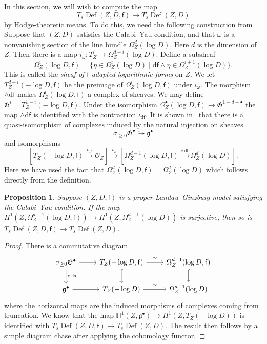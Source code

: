 \documentclass[10pt]{amsart}
\numberwithin{equation}{section}
\theoremstyle{plain}
\newtheorem{proposition}[theorem]{Proposition}
\theoremstyle{definition}
\theoremstyle{remark}
\DeclareMathOperator{\Def}{Def}
\begin{document}
In this section, we will wish to compute the map
\[
  T_s \Def(Z,D,\mathsf{f})\rightarrow T_s \Def(Z,D)
\]
by Hodge-theoretic means. To do this, we need the following construction from~\cite{katzarkov2017bogomolov}. Suppose that \((Z,D)\) satisfies the Calabi--Yau condition, and that \(\omega\) is a nonvanishing section of the line bundle \(\Omega^d_Z(\log D)\). Here \(d\) is the dimension of \(Z\). Then there is a map \(i_\omega: T^i_Z\rightarrow \Omega^{d-i}_Z(\log D)\). Define a subsheaf
\[
  \Omega_Z^i(\log D,\mathsf{f}) = \{ \eta \in \Omega_Z^i(\log D) \mid \mathrm{d}\mathsf{f} \wedge \eta \in \Omega_Z^{i+1}(\log D)\}.
\]
This is called the \emph{sheaf of \(\mathsf{f}\)-adapted logarithmic forms} on \(Z\). We let \(T^{d-i}_Z(-\log D, \mathsf{f})\) be the preimage of \(\Omega_Z^i(\log D,\mathsf{f})\) under \(i_\omega\). The morphism \(\wedge \mathrm{d}\mathsf{f}\) makes \(\Omega_{Z}^i(\log D,\mathsf{f})\) a complex of sheaves. We may define \(\mathfrak{G}^i = T^{1-i}_Z(-\log  D, \mathsf{f})\). Under the isomorphism \(\Omega_Z^\bullet(\log D, \mathsf{f})\rightarrow \mathfrak{G}^{1-d+\bullet}\) the map \(\wedge \mathrm{d}\mathsf{f}\) is identified with the contraction \(\iota_{\mathrm{d}\mathsf{f}}\). It is shown in~\cite{katzarkov2017bogomolov} that there is a quasi-isomorphism of complexes induced by the natural injection on sheaves
\[
  \sigma_{\geq 0} \mathfrak{G}^\bullet \hookrightarrow \mathfrak{g}^\bullet
\]
and isomorphisms
\[
  \left[ T_Z(-\log D, \mathsf{f} ) \xrightarrow{\iota_{\mathrm{d}\mathsf{f}}} \mathcal{O}_Z\right] \xrightarrow{ \iota_{\omega} } \left[ \Omega^{d-1}_Z(\log D,\mathsf{f}) \xrightarrow{\wedge \mathrm{d}\mathsf{f} }\Omega^d_Z(\log D)\right].
\]
Here we have used the fact that \(\Omega_Z^d(\log D,\mathsf{f}) = \Omega_Z^d(\log D)\) which follows directly from the definition.

\begin{proposition}\label{proposition:surjmap}
  Suppose \((Z,D,\mathsf{f})\) is a proper Landau--Ginzburg model satisfying the Calabi--Yau condition. If the map \(H^{1}(Z,\Omega^{d-1}_Z(\log D,\mathsf{f})) \rightarrow H^1(Z,\Omega^{d-1}_Z(\log D))\) is surjective, then so is \(T_s \Def(Z,D,\mathsf{f}) \rightarrow T_s \Def(Z,D)\).
\end{proposition}

\begin{proof}
  There is a commutative diagram
  \[
    \begin{tikzcd}
      \sigma_{\geq 0}\mathfrak{G}^\bullet \ar[d,"\mathrm{q.is}"] \ar[r] & T_Z(-\log D ,\mathsf{f} ) \ar[r,"\cong"] \ar[d,hookrightarrow] &  \Omega^{d-1}_Z(\log D,\mathsf{f}) \ar[d,hookrightarrow] \\
    \mathfrak{g}^\bullet \ar[r] & T_Z(-\log D) \ar[r,"\cong"] & \Omega_Z^{d-1}(\log D)
    \end{tikzcd}
  \]
  where the horizontal maps are the induced morphisms of complexes coming from truncation. We know that the map \(\mathbb{H}^1(Z,\mathfrak{g}^\bullet) \rightarrow H^1(Z,T_Z(-\log D))\) is identified with \(T_s \Def(Z,D,\mathsf{f}) \rightarrow T_s \Def(Z,D)\). The result then follows by a simple diagram chase after applying the cohomology functor.
\end{proof}
\end{document}

